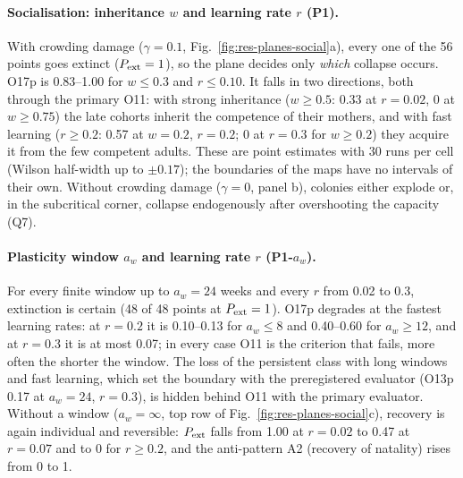 \paragraph{Socialisation: inheritance $w$ and learning rate $r$ (P1).}
With crowding damage ($\gamma=0.1$, Fig.~\ref{fig:res-planes-social}a), every one of the 56 points goes extinct
($P_{\rm ext}=1$), so the plane decides only \emph{which} collapse occurs. O17p is 0.83--1.00 for $w\le0.3$ and
$r\le0.10$. It falls in two directions, both through the primary O11: with strong inheritance ($w\ge0.5$: 0.33 at
$r=0.02$, 0 at $w\ge0.75$) the late cohorts inherit the competence of their mothers, and with fast learning
($r\ge0.2$: 0.57 at $w=0.2$, $r=0.2$; 0 at $r=0.3$ for $w\ge0.2$) they acquire it from the few competent adults.
These are point estimates with 30 runs per cell (Wilson half-width up to $\pm0.17$); the boundaries of the maps have
no intervals of their own. Without crowding damage ($\gamma=0$, panel b), colonies either explode or, in the
subcritical corner, collapse endogenously after overshooting the capacity (Q7).

\paragraph{Plasticity window $a_w$ and learning rate $r$ (P1-$a_w$).}
For every finite window up to $a_w=24$ weeks and every $r$ from 0.02 to 0.3, extinction is certain (48 of 48
points at $P_{\rm ext}=1$). O17p degrades at the fastest learning rates: at $r=0.2$ it is 0.10--0.13 for
$a_w\le8$ and 0.40--0.60 for $a_w\ge12$, and at $r=0.3$ it is at most 0.07; in every case O11 is the criterion that
fails, more often the shorter the window. The loss of the persistent class with long windows and fast learning,
which set the boundary with the preregistered evaluator (O13p 0.17 at $a_w=24$, $r=0.3$), is hidden behind O11 with the primary evaluator.
Without a window ($a_w=\infty$, top row of Fig.~\ref{fig:res-planes-social}c), recovery is again individual and
reversible: $P_{\rm ext}$ falls from 1.00 at $r=0.02$ to 0.47 at $r=0.07$ and to 0 for $r\ge0.2$, and the
anti-pattern A2 (recovery of natality) rises from 0 to 1.

